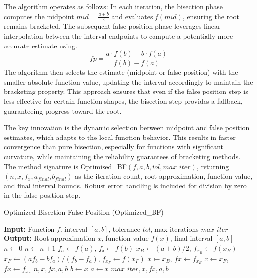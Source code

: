 \documentclass[amsmath, amssymb, aps]{revtex4-2}
\begin{document}
The algorithm operates as follows: In each iteration, the bisection phase computes the midpoint $mid = \frac{a + b}{2}$ and evaluates $f(mid)$, ensuring the root remains bracketed. The subsequent false position phase leverages linear interpolation between the interval endpoints to compute a potentially more accurate estimate using:
\begin{equation}
fp = \frac{a \cdot f(b) - b \cdot f(a)}{f(b) - f(a)}
\end{equation}
The algorithm then selects the estimate (midpoint or false position) with the smaller absolute function value, updating the interval accordingly to maintain the bracketing property. This approach ensures that even if the false position step is less effective for certain function shapes, the bisection step provides a fallback, guaranteeing progress toward the root.

The key innovation is the dynamic selection between midpoint and false position estimates, which adapts to the local function behavior. This results in faster convergence than pure bisection, especially for functions with significant curvature, while maintaining the reliability guarantees of bracketing methods. The method signature is Optimized\_BF$(f, a, b, tol, max\_iter)$, returning $(n, x, f_x, a_{final}, b_{final})$ as the iteration count, root approximation, function value, and final interval bounds. Robust error handling is included for division by zero in the false position step.

\begin{algorithm}[H]
\caption{Optimized Bisection-False Position (Optimized\_BF)}
\begin{algorithmic}[1]
\State \textbf{Input:} Function $f$, interval $[a, b]$, tolerance $tol$, max iterations $max\_iter$
\State \textbf{Output:} Root approximation $x$, function value $f(x)$, final interval $[a, b]$
\State $n \gets 0$
    \State $n \gets n + 1$
    \State $f_a \gets f(a)$, $f_b \gets f(b)$
    \State $x_B \gets (a + b)/2$, $f_{x_B} \gets f(x_B)$
    \State $x_F \gets (a f_b - b f_a)/(f_b - f_a)$, $f_{x_F} \gets f(x_F)$
        \State $x \gets x_B$, $fx \gets f_{x_B}$
    \Else
        \State $x \gets x_F$, $fx \gets f_{x_F}$
    \EndIf
        \State \Return $n, x, fx, a, b$
    \EndIf
        \State $b \gets x$
    \Else
        \State $a \gets x$
    \EndIf
\EndWhile
\State \Return $max\_iter, x, fx, a, b$
\end{algorithmic}
\end{algorithm}
\end{document}
